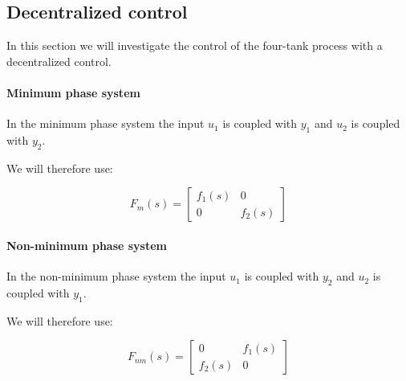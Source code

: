 \subsection{Decentralized control}

In this section we will investigate the control of the four-tank process with a decentralized control. 

\paragraph{Minimum phase system}

In the minimum phase system the input $u_1$ is coupled with $y_1$ and $u_2$ is coupled with $y_2$. 

We will therefore use:

$$F_m(s) = \left[\begin{array}{cc} f_1(s) & 0 \\ 0 & f_2(s) \end{array}\right]$$

\paragraph{Non-minimum phase system}

In the non-minimum phase system the input $u_1$ is coupled with $y_2$ and $u_2$ is coupled with $y_1$. 

We will therefore use:

$$F_{nm}(s) = \left[\begin{array}{cc} 0 & f_1(s) \\ f_2(s) & 0 \end{array}\right]$$





